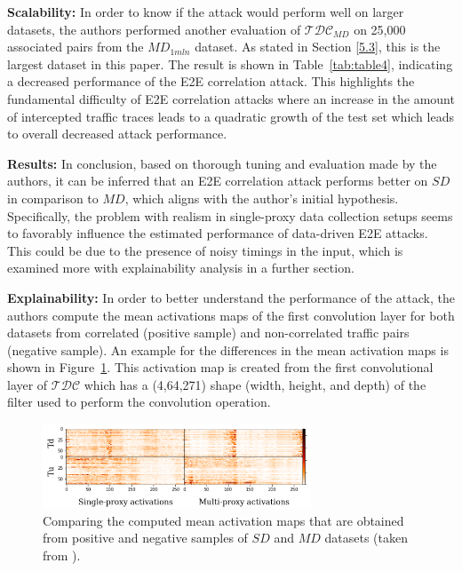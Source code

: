 \documentclass[sigconf]{acmart}
\begin{document}
\vspace{-1mm}

\textbf{Scalability:} In order to know if the attack would perform well on larger datasets, the authors performed another evaluation of \(\mathcal{TDC}\)$_{MD}$ on 25,000 associated pairs from the $MD$$_{1mln}$ dataset. As stated in Section \ref{5.3}, this is the largest dataset in this paper. The result is shown in Table~\ref{tab:table4}, indicating a decreased performance of the E2E correlation attack. This highlights the fundamental difficulty of E2E correlation attacks where an increase in the amount of intercepted traffic traces leads to a quadratic growth of the test set which leads to overall decreased attack performance.

\vspace{3mm}

\textbf{Results:} In conclusion, based on thorough tuning and evaluation made by the authors, it can be inferred that an E2E correlation attack performs better on $SD$ in comparison to $MD$, which aligns with the author's initial hypothesis. Specifically, the problem with realism in single-proxy data collection setups seems to favorably influence the estimated performance of data-driven E2E attacks. This could be due to the presence of noisy timings in the input, which is examined more with explainability analysis in a further section.


\vspace{4mm}

\textbf{Explainability:} In order to better understand the performance of the attack, the authors compute the mean activations maps of the first convolution layer for both datasets from correlated (positive sample) and non-correlated traffic pairs (negative sample). An example for the differences in the mean activation maps is shown in Figure~\ref{fig:6}. This activation map is created from the first convolutional layer of \(\mathcal{TDC}\) which has a (4,64,271) shape (width, height, and depth) of the filter used to perform the convolution operation.
\vspace{3mm}

\begin{figure}[H]
  \centering
  \includegraphics[width=8cm]{Figure_6.png}
 \caption{\textmd{Comparing the computed mean activation maps that are obtained from positive and negative samples of $SD$ and $MD$ datasets (taken from \cite{RimmerV}).}}
 \label{fig:6}
\end{figure}
\end{document}
